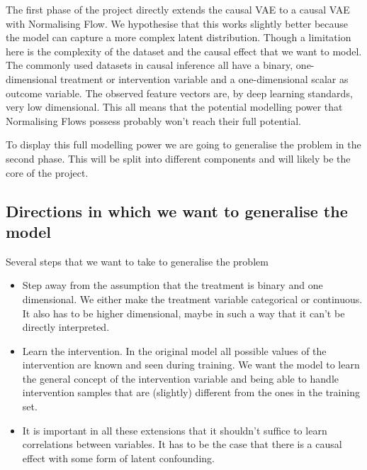 \documentclass{article}
\begin{document}
The first phase of the project directly extends the causal VAE to a causal VAE with Normalising Flow. We hypothesise that this works slightly better because the model can capture a more complex latent distribution. Though a limitation here is the complexity of the dataset and the causal effect that we want to model. The commonly used datasets in causal inference all have a binary, one-dimensional treatment or intervention variable and a one-dimensional scalar as outcome variable. The observed feature vectors are, by deep learning standards, very low dimensional. This all means that the potential modelling power that Normalising Flows possess probably won't reach their full potential. 

To display this full modelling power we are going to generalise the problem in the second phase. This will be split into different components and will likely be the core of the project.

\subsection{Directions in which we want to generalise the model}
Several steps that we want to take to generalise the problem
\begin{itemize}
    \item Step away from the assumption that the treatment is binary and one dimensional. We either make the treatment variable categorical or continuous. It also has to be higher dimensional, maybe in such a way that it can't be directly interpreted.
    \item Learn the intervention. In the original model all possible values of the intervention are known and seen during training. We want the model to learn the general concept of the intervention variable and being able to handle intervention samples that are (slightly) different from the ones in the training set.
    \item It is important in all these extensions that it shouldn't suffice to learn correlations between variables. It has to be the case that there is a causal effect with some form of latent confounding.
\end{itemize}


\end{document}
